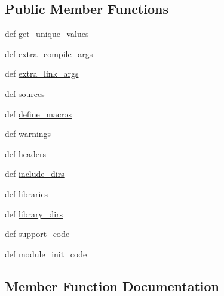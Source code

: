 \subsection*{Public Member Functions}
\begin{DoxyCompactItemize}
\item 
def \hyperlink{classscipy_1_1weave_1_1base__info_1_1info__list_a8c2a9f1394de67647e0812deed912650}{get\+\_\+unique\+\_\+values}
\item 
def \hyperlink{classscipy_1_1weave_1_1base__info_1_1info__list_ac71a35a9a8833fbdd4c2f346425e5c0a}{extra\+\_\+compile\+\_\+args}
\item 
def \hyperlink{classscipy_1_1weave_1_1base__info_1_1info__list_acb64ce6b307ade6d1589e655023152b4}{extra\+\_\+link\+\_\+args}
\item 
def \hyperlink{classscipy_1_1weave_1_1base__info_1_1info__list_a0e20e03a844e686c46e4f960577ea84e}{sources}
\item 
def \hyperlink{classscipy_1_1weave_1_1base__info_1_1info__list_ac6ffcff0cde8a2b04443de0b7d693023}{define\+\_\+macros}
\item 
def \hyperlink{classscipy_1_1weave_1_1base__info_1_1info__list_abfd713e29543db659831f54f3ba3e372}{warnings}
\item 
def \hyperlink{classscipy_1_1weave_1_1base__info_1_1info__list_a021f3dd0a3d90cc007b372600805fca2}{headers}
\item 
def \hyperlink{classscipy_1_1weave_1_1base__info_1_1info__list_adbc07e71bf4998a0cb2f3417ca6b1743}{include\+\_\+dirs}
\item 
def \hyperlink{classscipy_1_1weave_1_1base__info_1_1info__list_ab687b17118bb6fda25d496c548c50678}{libraries}
\item 
def \hyperlink{classscipy_1_1weave_1_1base__info_1_1info__list_ab88b8411de9bffd61cd17e449d5c8ed9}{library\+\_\+dirs}
\item 
def \hyperlink{classscipy_1_1weave_1_1base__info_1_1info__list_ae24e6301c8cb8d62afb6f941370045f5}{support\+\_\+code}
\item 
def \hyperlink{classscipy_1_1weave_1_1base__info_1_1info__list_acf97a3922c2f7b27a28bf6eccdaed96b}{module\+\_\+init\+\_\+code}
\end{DoxyCompactItemize}


\subsection{Member Function Documentation}
\hypertarget{classscipy_1_1weave_1_1base__info_1_1info__list_ac6ffcff0cde8a2b04443de0b7d693023}{}
